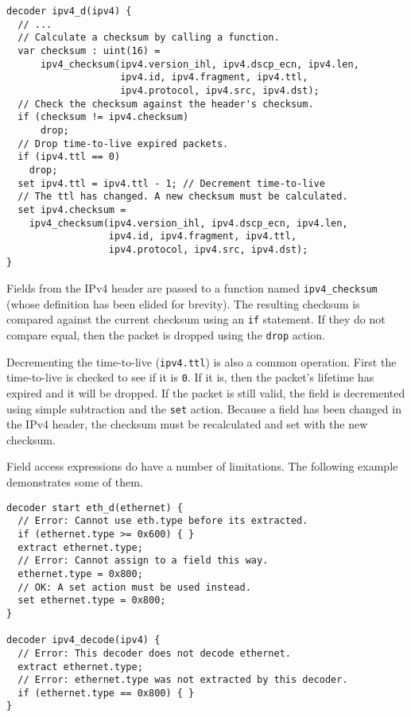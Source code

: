 \begin{lstlisting}
decoder ipv4_d(ipv4) {
  // ...
  // Calculate a checksum by calling a function.
  var checksum : uint(16) =
      ipv4_checksum(ipv4.version_ihl, ipv4.dscp_ecn, ipv4.len, 
                    ipv4.id, ipv4.fragment, ipv4.ttl, 
                    ipv4.protocol, ipv4.src, ipv4.dst);
  // Check the checksum against the header's checksum.
  if (checksum != ipv4.checksum)
	  drop;
  // Drop time-to-live expired packets.
  if (ipv4.ttl == 0)
    drop;
  set ipv4.ttl = ipv4.ttl - 1; // Decrement time-to-live
  // The ttl has changed. A new checksum must be calculated.
  set ipv4.checksum =
    ipv4_checksum(ipv4.version_ihl, ipv4.dscp_ecn, ipv4.len, 
                  ipv4.id, ipv4.fragment, ipv4.ttl, 
                  ipv4.protocol, ipv4.src, ipv4.dst);
}
\end{lstlisting}

Fields from the IPv4 header are passed to a function named 
\texttt{ipv4\_checksum} (whose definition has been elided for brevity). The 
resulting checksum is compared against the current checksum using an \texttt{if} 
statement. If they do not compare equal, then the packet is dropped using the 
\texttt{drop} action.

Decrementing the time-to-live (\texttt{ipv4.ttl}) is also a common operation. 
First the time-to-live is checked to see if it is \texttt{0}. If it is, then the 
packet's lifetime has expired and it will be dropped. If the packet is still 
valid, the field is decremented using simple subtraction and the 
\texttt{set} action. Because a field has been changed in the IPv4 
header, the checksum must be recalculated and set with the new checksum.

Field access expressions do have a number of limitations. The following example
demonstrates some of them.

\begin{lstlisting}
decoder start eth_d(ethernet) {
  // Error: Cannot use eth.type before its extracted.
  if (ethernet.type >= 0x600) { }
  extract ethernet.type;
  // Error: Cannot assign to a field this way.
  ethernet.type = 0x800;
  // OK: A set action must be used instead.
  set ethernet.type = 0x800;
}

decoder ipv4_decode(ipv4) {
  // Error: This decoder does not decode ethernet.
  extract ethernet.type;
  // Error: ethernet.type was not extracted by this decoder.
  if (ethernet.type == 0x800) { }
}
\end{lstlisting}

